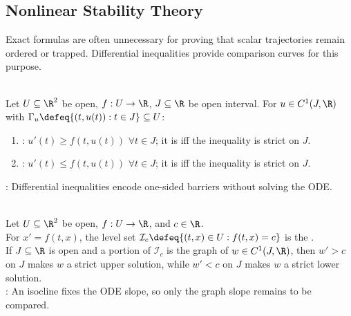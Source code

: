 \subsection{Nonlinear Stability Theory}

Exact formulas are often unnecessary for proving that scalar trajectories remain ordered or trapped. Differential inequalities provide comparison curves for this purpose.

\begin{definition} \label{def:scalar-upper-lower-solutions} \\
Let $U\subseteq\R^2$ be open, $f:U\to\R$, $J\subseteq\R$ be open interval. For $u\in C^1(J,\R)$ with $\Gamma_u\defeq\{(t,u(t)):t\in J\}\subseteq U$:
\begin{enumerate}[label=(\roman*)]
\setlength{\itemsep}{0pt}
\item {}: $u'(t)\geq f(t,u(t))$ $\forall t\in J$; it is  iff the inequality is strict on $J$.
\item {}: $u'(t)\leq f(t,u(t))$ $\forall t\in J$; it is  iff the inequality is strict on $J$.
\end{enumerate}
: Differential inequalities encode one-sided barriers without solving the ODE.
\end{definition}

\begin{definition} \label{def:scalar-isocline} \\
Let $U\subseteq\R^2$ be open, $f:U\to\R$, and $c\in\R$.\\
For $x'=f(t,x)$, the level set $\mathcal{I}_c\defeq\{(t,x)\in U:f(t,x)=c\}$ is the .\\
If $J\subseteq\R$ is open and a portion of $\mathcal{I}_c$ is the graph of $w\in C^1(J,\R)$, then $w'>c$ on $J$ makes $w$ a strict upper solution, while $w'<c$ on $J$ makes $w$ a strict lower solution.\\
: An isocline fixes the ODE slope, so only the graph slope remains to be compared.
\end{definition}

